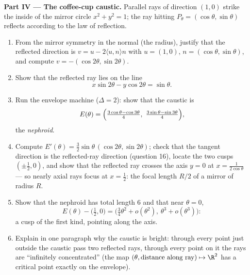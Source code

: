 \begin{problem}
\medskip
\noindent\textbf{Part IV --- The coffee-cup caustic.} Parallel
rays of direction $(1, 0)$ strike the inside of the mirror
circle $x^2 + y^2 = 1$; the ray hitting $P_\theta =
(\cos\theta, \sin\theta)$ reflects according to the law of
reflection.
\begin{enumerate}[resume]
  \item From the mirror symmetry in the normal (the radius),
        justify that the reflected direction is $v = u -
        2\langle u, n\rangle n$ with $u = (1,0)$, $n =
        (\cos\theta, \sin\theta)$, and compute $v =
        -(\cos2\theta, \sin2\theta)$.
  \item Show that the reflected ray lies on the line
        \[
        x\sin 2\theta - y\cos 2\theta = \sin\theta .
        \]
  \item Run the envelope machine ($\Delta = 2$): show that
        the caustic is
        \[
        E(\theta) = \Bigl(\tfrac{3\cos\theta -
        \cos3\theta}4,\ \tfrac{3\sin\theta -
        \sin3\theta}4\Bigr),
        \]
        the \emph{nephroid}.
  \item Compute $E'(\theta) = \tfrac32\sin\theta\,
        (\cos2\theta, \sin2\theta)$; check that the tangent
        direction is the reflected-ray direction (question
        16), locate the two cusps $(\pm\tfrac12, 0)$, and
        show that the reflected ray crosses the axis $y = 0$
        at $x = \frac1{2\cos\theta}$ --- so nearly axial rays
        focus at $x = \tfrac12$: the focal length $R/2$ of a
        mirror of radius $R$.
  \item Show that the nephroid has total length $6$ and that
        near $\theta = 0$,
        \[
        E(\theta) - \bigl(\tfrac12, 0\bigr) =
        \bigl(\tfrac34\theta^2 + o(\theta^2),\ \theta^3 +
        o(\theta^3)\bigr) :
        \]
        a cusp of the first kind, pointing along the axis.
  \item Explain in one paragraph why the caustic is bright:
        through every point just outside the caustic pass two
        reflected rays, through every point on it the rays
        are ``infinitely concentrated'' (the map $(\theta,
        \text{distance along ray}) \mapsto \R^2$ has a
        critical point exactly on the envelope).
\end{enumerate}


\end{problem}
